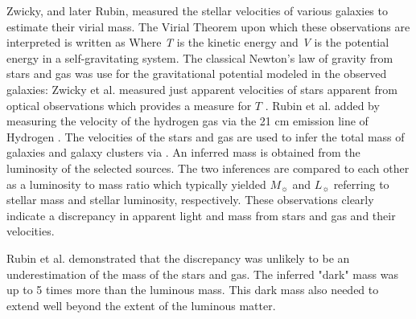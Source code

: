 Zwicky, and later Rubin, measured the stellar velocities of various galaxies to estimate their virial mass.
The Virial Theorem upon which these observations are interpreted is written as \virialtheorem
Where \textit{T} is the kinetic energy and \textit{V} is the potential energy in a self-gravitating system.
The classical Newton's law of gravity from stars and gas was use for the gravitational potential modeled in the observed galaxies:
\newtongravity
Zwicky et al. measured just apparent velocities of stars apparent from optical observations which provides a measure for $T$ \cite{Zwicky:1933}.
Rubin et al. added by measuring the velocity of the hydrogen gas via the 21 cm emission line of Hydrogen \cite{Rubin:1978}.
The velocities of the stars and gas are used to infer the total mass of galaxies and galaxy clusters via .
An inferred mass is obtained from the luminosity of the selected sources.
The two inferences are compared to each other as a luminosity to mass ratio which typically yielded \cite{Greene:cosmology_dm}
\masslightratio
$M_{\sun}$ and $L_{\sun}$ referring to stellar mass and stellar luminosity, respectively.
These observations clearly indicate a discrepancy in apparent light and mass from stars and gas and their velocities.

Rubin et al. \cite{Rubin:1978} demonstrated that the discrepancy was unlikely to be an underestimation of the mass of the stars and gas.
The inferred "dark" mass was up to 5 times more than the luminous mass.
This dark mass also needed to extend well beyond the extent of the luminous matter.

\begin{figure}[t]
\end{figure}

